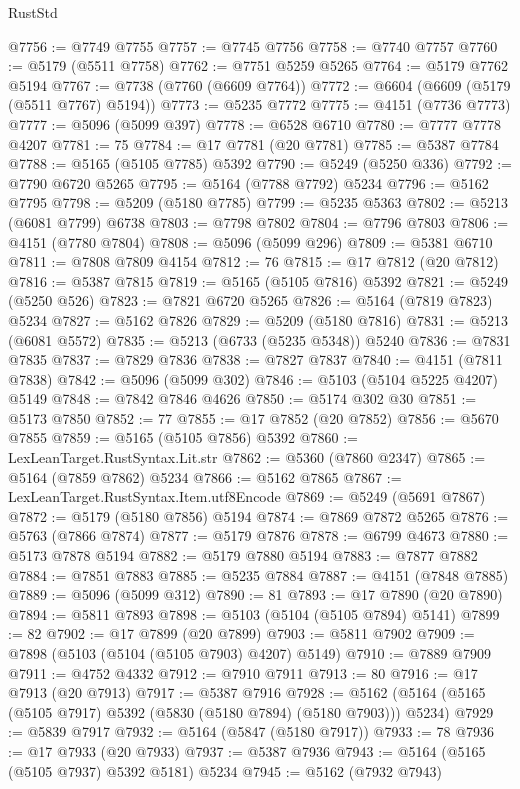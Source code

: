 \begin{lexlean}{RustStd}
\begin{coremodule}
@7756 := @7749 @7755
@7757 := @7745 @7756
@7758 := @7740 @7757
@7760 := @5179 (@5511 @7758)
@7762 := @7751 @5259 @5265
@7764 := @5179 @7762 @5194
@7767 := @7738 (@7760 (@6609 @7764))
@7772 := @6604 (@6609 (@5179 (@5511 @7767) @5194))
@7773 := @5235 @7772
@7775 := @4151 (@7736 @7773)
@7777 := @5096 (@5099 @397)
@7778 := @6528 @6710
@7780 := @7777 @7778 @4207
@7781 := 75
@7784 := @17 @7781 (@20 @7781)
@7785 := @5387 @7784
@7788 := @5165 (@5105 @7785) @5392
@7790 := @5249 (@5250 @336)
@7792 := @7790 @6720 @5265
@7795 := @5164 (@7788 @7792) @5234
@7796 := @5162 @7795
@7798 := @5209 (@5180 @7785)
@7799 := @5235 @5363
@7802 := @5213 (@6081 @7799) @6738
@7803 := @7798 @7802
@7804 := @7796 @7803
@7806 := @4151 (@7780 @7804)
@7808 := @5096 (@5099 @296)
@7809 := @5381 @6710
@7811 := @7808 @7809 @4154
@7812 := 76
@7815 := @17 @7812 (@20 @7812)
@7816 := @5387 @7815
@7819 := @5165 (@5105 @7816) @5392
@7821 := @5249 (@5250 @526)
@7823 := @7821 @6720 @5265
@7826 := @5164 (@7819 @7823) @5234
@7827 := @5162 @7826
@7829 := @5209 (@5180 @7816)
@7831 := @5213 (@6081 @5572)
@7835 := @5213 (@6733 (@5235 @5348)) @5240
@7836 := @7831 @7835
@7837 := @7829 @7836
@7838 := @7827 @7837
@7840 := @4151 (@7811 @7838)
@7842 := @5096 (@5099 @302)
@7846 := @5103 (@5104 @5225 @4207) @5149
@7848 := @7842 @7846 @4626
@7850 := @5174 @302 @30
@7851 := @5173 @7850
@7852 := 77
@7855 := @17 @7852 (@20 @7852)
@7856 := @5670 @7855
@7859 := @5165 (@5105 @7856) @5392
@7860 := LexLeanTarget.RustSyntax.Lit.str
@7862 := @5360 (@7860 @2347)
@7865 := @5164 (@7859 @7862) @5234
@7866 := @5162 @7865
@7867 := LexLeanTarget.RustSyntax.Item.utf8Encode
@7869 := @5249 (@5691 @7867)
@7872 := @5179 (@5180 @7856) @5194
@7874 := @7869 @7872 @5265
@7876 := @5763 (@7866 @7874)
@7877 := @5179 @7876
@7878 := @6799 @4673
@7880 := @5173 @7878 @5194
@7882 := @5179 @7880 @5194
@7883 := @7877 @7882
@7884 := @7851 @7883
@7885 := @5235 @7884
@7887 := @4151 (@7848 @7885)
@7889 := @5096 (@5099 @312)
@7890 := 81
@7893 := @17 @7890 (@20 @7890)
@7894 := @5811 @7893
@7898 := @5103 (@5104 (@5105 @7894) @5141)
@7899 := 82
@7902 := @17 @7899 (@20 @7899)
@7903 := @5811 @7902
@7909 := @7898 (@5103 (@5104 (@5105 @7903) @4207) @5149)
@7910 := @7889 @7909
@7911 := @4752 @4332
@7912 := @7910 @7911
@7913 := 80
@7916 := @17 @7913 (@20 @7913)
@7917 := @5387 @7916
@7928 := @5162 (@5164 (@5165 (@5105 @7917) @5392 (@5830 (@5180 @7894) (@5180 @7903))) @5234)
@7929 := @5839 @7917
@7932 := @5164 (@5847 (@5180 @7917))
@7933 := 78
@7936 := @17 @7933 (@20 @7933)
@7937 := @5387 @7936
@7943 := @5164 (@5165 (@5105 @7937) @5392 @5181) @5234
@7945 := @5162 (@7932 @7943)

\end{coremodule}
\end{lexlean}
